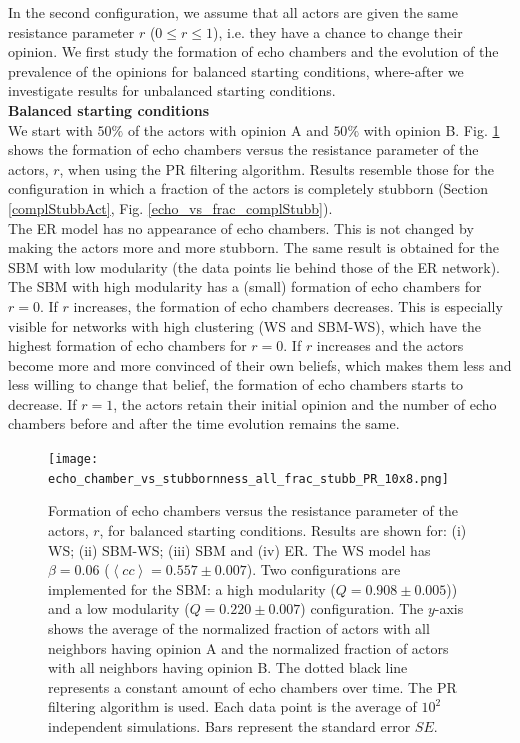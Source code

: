 \documentclass[11 pt , letterpaper , twoside , openright]{book}
\begin{document}
In the second configuration, we assume that all actors are given the same resistance parameter $r$ ($0 \leqslant r \leqslant 1$), i.e. they have a chance to change their opinion. We first study the formation of echo chambers and the evolution of the prevalence of the opinions for balanced starting conditions, where-after we investigate results for unbalanced starting conditions.\\
\newline
\textbf{Balanced starting conditions}\\
\newline
We start with $50 \%$ of the actors with opinion A and $50 \%$ with opinion B. Fig. \ref{echo_vs_all_frac_stubb_PR} shows the formation of echo chambers versus the resistance parameter of the actors, $r$, when using the PR filtering algorithm. Results resemble those for the configuration in which a fraction of the actors is completely stubborn (Section \ref{complStubbAct}, Fig. \ref{echo_vs_frac_complStubb}).\\
\newline
The ER model has no appearance of echo chambers. This is not changed by making the actors more and more stubborn. The same result is obtained for the SBM with low modularity (the data points lie behind those of the ER network). The SBM with high modularity has a (small) formation of echo chambers for $r=0$. If $r$ increases, the formation of echo chambers decreases. This is especially visible for networks with high clustering (WS and SBM-WS), which have the highest formation of echo chambers for $r=0$. If $r$ increases and the actors become more and more convinced of their own beliefs, which makes them less and less willing to change that belief, the formation of echo chambers starts to decrease. If $r=1$, the actors retain their initial opinion and the number of echo chambers before and after the time evolution remains the same.

\begin{figure}[H]
	\texttt{[image: echo\_chamber\_vs\_stubbornness\_all\_frac\_stubb\_PR\_10x8.png]}
	\captionsetup{format=plain}
	\caption[Formation of echo chambers versus the resistance parameter of the actors, $r$, for balanced starting conditions. The PR filtering algorithm is used.]{Formation of echo chambers versus the resistance parameter of the actors, $r$, for balanced starting conditions. Results are shown for: (i) WS; (ii) SBM-WS; (iii) SBM and (iv) ER. The WS model has $\beta = 0.06$ ($\left<cc\right> = 0.557 \pm 0.007$). Two configurations are implemented for the SBM: a high modularity ($Q = 0.908 \pm 0.005$)) and a low modularity ($Q = 0.220 \pm 0.007$) configuration. The $y$-axis shows the average of the normalized fraction of actors with all neighbors having opinion A and the normalized fraction of actors with all neighbors having opinion B. The dotted black line represents a constant amount of echo chambers over time. The PR filtering algorithm is used. Each data point is the average of $10^2$ independent simulations. Bars represent the standard error $SE$.}
\label{echo_vs_all_frac_stubb_PR}
\end{figure}
\end{document}
